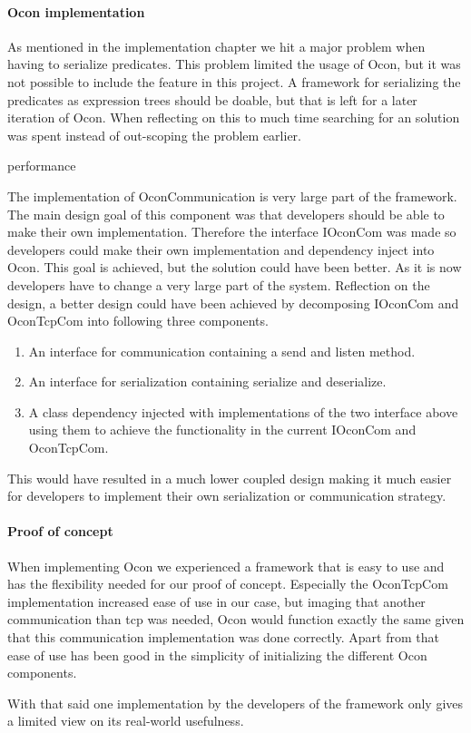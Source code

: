 \documentclass[../report.tex]{subfiles}
\begin{document}
\graphicspath{{img/}{../img/}}


\paragraph{Ocon implementation}
As mentioned in the implementation chapter we hit a major problem when having to serialize predicates. This problem limited the usage of Ocon, but it was not possible to include the feature in this project. A framework for serializing the predicates as expression trees should be doable, but that is left for a later iteration of Ocon. When reflecting on this to much time searching for an solution was spent instead of out-scoping the problem earlier. 

performance

The implementation of OconCommunication is very large part of the framework. The main design goal of this component was that developers should be able to make their own implementation. Therefore the interface IOconCom was made so developers could make their own implementation and dependency inject into Ocon. This goal is achieved, but the solution could have been better. As it is now developers have to change a very large part of the system. Reflection on the design, a better design could have been achieved by decomposing IOconCom and OconTcpCom into following three components.

\begin{enumerate}
\item An interface for communication containing a send and listen method.
\item An interface for serialization containing serialize and deserialize.
\item A class dependency injected with implementations of the two interface above using them to achieve the functionality in the current IOconCom and OconTcpCom.
\end{enumerate}

This would have resulted in a much lower coupled design making it much easier for developers to implement their own serialization or communication strategy.

\paragraph{Proof of concept}
When implementing Ocon we experienced a framework that is easy to use and has the flexibility needed for our proof of concept. Especially the OconTcpCom implementation increased ease of use in our case, but imaging that another communication than tcp was needed, Ocon would function exactly the same given that this communication implementation was done correctly. Apart from that ease of use has been good in the simplicity of initializing the different Ocon components.

With that said one implementation by the developers of the framework only gives a limited view on its real-world usefulness.
\end{document}
